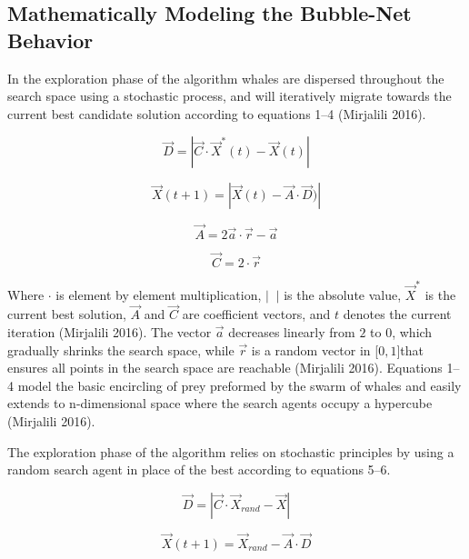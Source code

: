 \documentclass[11pt]{article}
\begin{document}
\subsection*{Mathematically Modeling the Bubble-Net Behavior} {
    In the exploration phase of the algorithm whales are dispersed throughout the search space using a stochastic process, and will iteratively migrate towards the current best candidate solution according to equations 1--4 (Mirjalili 2016).

    \begin{equation}
        \vec{D} = |\vec{C}\cdot\vec{X}^*(t) - \vec{X}(t)|
    \end{equation}

    \begin{equation}
        \vec{X}(t + 1) = |\vec{X}(t) - \vec{A}\cdot\vec{D})|
    \end{equation}

    \begin{equation}
        \vec{A} = 2\vec{a}\cdot\vec{r}-\vec{a}
    \end{equation}

    \begin{equation}
        \vec{C} = 2\cdot\vec{r}
    \end{equation}

    Where $\cdot$ is element by element multiplication, $| \;\; |$ is the absolute value, $\vec{X}^*$ is the current best solution, $\vec{A}$ and $\vec{C}$ are coefficient vectors, and $t$ denotes the current iteration (Mirjalili 2016).
    The vector $\vec{a}$ decreases linearly from $2$ to $0$, which gradually shrinks the search space, while $\vec{r}$ is a random vector in [$0,1]$that ensures all points in the search space are reachable (Mirjalili 2016).
    Equations 1--4 model the basic encircling of prey preformed by the swarm of whales and easily extends to n-dimensional space where the search agents occupy a hypercube (Mirjalili 2016).

    The exploration phase of the algorithm relies on stochastic principles by using a random search agent in place of the best according to equations 5--6.

    \begin{equation}
        \vec{D} = |\vec{C}\cdot\vec{X}_{rand} - \vec{X}|
    \end{equation}

    \begin{equation}
        \vec{X}(t+1) = \vec{X}_{rand} - \vec{A}\cdot\vec{D}
    \end{equation}

}
\end{document}
